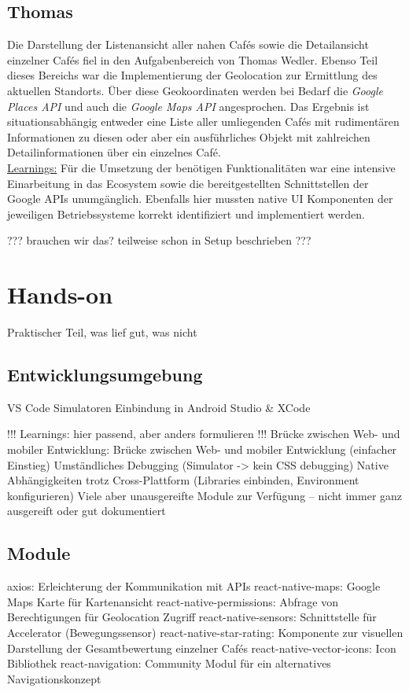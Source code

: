 \subsection{Thomas}
Die Darstellung der Listenansicht aller nahen Cafés sowie die Detailansicht einzelner Cafés fiel in den Aufgabenbereich von Thomas Wedler.
Ebenso Teil dieses Bereichs war die Implementierung der Geolocation zur Ermittlung des aktuellen Standorts.
Über diese Geokoordinaten werden bei Bedarf die \emph{Google Places API} und auch die \emph{Google Maps API} angesprochen.
Das Ergebnis ist situationsabhängig entweder eine Liste aller umliegenden Cafés mit rudimentären Informationen zu diesen oder aber ein ausführliches Objekt mit zahlreichen Detailinformationen über ein einzelnes Café.
\\
\underline{Learnings:}
Für die Umsetzung der benötigen Funktionalitäten war eine intensive Einarbeitung in das Ecosystem sowie die bereitgestellten Schnittstellen der Google APIs unumgänglich.
Ebenfalls hier mussten native UI Komponenten der jeweiligen Betriebssysteme korrekt identifiziert und implementiert werden.







??? brauchen wir das? teilweise schon in Setup beschrieben ???

\section{Hands-on}
Praktischer Teil, was lief gut, was nicht

\subsection{Entwicklungsumgebung}
VS Code
Simulatoren
Einbindung in Android Studio \& XCode

!!! Learnings: hier passend, aber anders formulieren !!!
Brücke zwischen Web- und mobiler Entwicklung: Brücke zwischen Web- und mobiler Entwicklung (einfacher Einstieg)
Umständliches Debugging (Simulator -> kein CSS debugging)
Native Abhängigkeiten trotz Cross-Plattform (Libraries einbinden, Environment konfigurieren)
Viele aber unausgereifte Module zur Verfügung – nicht immer ganz ausgereift oder gut dokumentiert

\subsection{Module}
axios: Erleichterung der Kommunikation mit APIs
react-native-maps: Google Maps Karte für Kartenansicht
react-native-permissions: Abfrage von Berechtigungen für Geolocation Zugriff
react-native-sensors: Schnittstelle für Accelerator (Bewegungssensor)
react-native-star-rating: Komponente zur visuellen Darstellung der Gesamtbewertung einzelner Cafés
react-native-vector-icons: Icon Bibliothek
react-navigation: Community Modul für ein alternatives Navigationskonzept

